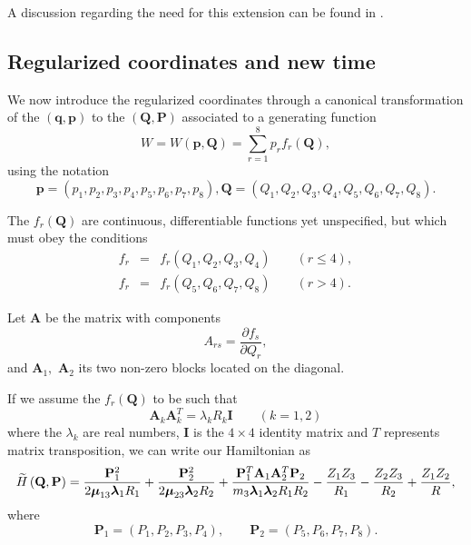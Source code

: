 \documentclass[thmsa]{article}
\begin{document}
A discussion regarding the need for this extension can be found in \cite
{Aarseth}.

\subsection{Regularized coordinates and new time}

We now introduce the regularized coordinates through a canonical
transformation of the $(\mathbf{q},\mathbf{p})$ to the $(\mathbf{Q},\mathbf{P%
})$ associated to a generating function 
\begin{equation}
W=W(\mathbf{p},\mathbf{Q})=\sum_{r=1}^8p_rf_r(\mathbf{Q}),  \label{e5b}
\end{equation}
using the notation 
\begin{equation}
\mathbf{p}=(p_1,p_2,p_3,p_4,p_5,p_6,p_7,p_8),\mathbf{Q}%
=(Q_1,Q_2,Q_3,Q_4,Q_5,Q_6,Q_7,Q_8).
\end{equation}

The $f_r(\mathbf{Q})$ are continuous, differentiable functions yet
unspecified, but which must obey the conditions 
\begin{eqnarray}
f_r &=&f_r(Q_1,Q_2,Q_3,Q_4)\quad \quad (r\leq 4),  \label{e5c} \\
f_r &=&f_r(Q_5,Q_6,Q_7,Q_8)\quad \quad (r>4).  \label{e5cc}
\end{eqnarray}

Let $\mathbf{A}$ be the matrix with components 
\begin{equation}
A_{rs}=\frac{\partial f_s}{\partial Q_r},
\end{equation}
and $\mathbf{A}_1,$ $\mathbf{A}_2$ its two non-zero blocks located on the
diagonal.

If we assume the $f_r(\mathbf{Q})$ to be such that 
\begin{equation}
\mathbf{A}_k\mathbf{A}_k^T=\lambda _kR_k\mathbf{I}\qquad (k=1,2)  \label{e5d}
\end{equation}
where the $\lambda _k$ are real numbers, $\mathbf{I}$ is the $4\times 4$
identity matrix and $T$ represents matrix transposition, we can write our
Hamiltonian as 
\begin{equation}
\widetilde{H}\left( \mathbf{Q},\mathbf{P}\right) =\frac{\mathbf{P}_1^2}{2\mu
_{13}\lambda _1R_1}+\frac{\mathbf{P}_2^2}{2\mu _{23}\lambda _2R_2}+\frac{%
\mathbf{P}_1^T\mathbf{A}_1\mathbf{A}_2^T\mathbf{P}_2}{m_3\lambda _1\lambda
_2R_1R_2}-\frac{Z_1Z_3}{R_1}-\frac{Z_2Z_3}{R_2}+\frac{Z_1Z_2}R,  \label{e6a}
\end{equation}
where 
\begin{equation}
\mathbf{P}_1=(P_1,P_2,P_3,P_4),\quad \quad \mathbf{P}_2=(P_5,P_6,P_7,P_8).
\end{equation}
\end{document}
